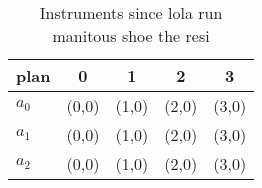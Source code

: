 \documentclass[a4paper]{article}
\begin{document}
\begin{table}
\begin{adjustbox}{width=0.5\columnwidth}
\begin{tabular}{|l|l|l|l|l|}
\hline
\textbf{plan} & \multicolumn{1}{c|}{\textbf{0}} & \multicolumn{1}{c|}{\textbf{1}} & \multicolumn{1}{c|}{\textbf{2}} & \multicolumn{1}{c|}{\textbf{3}} \\ \hline
\textbf{$a_0$}  & (0,0) & (1,0) & (2,0) & (3,0) \\ \hline
\textbf{$a_1$}  & (0,0) & (1,0) & (2,0) & (3,0) \\ \hline
\textbf{$a_2$}  & (0,0) & (1,0) & (2,0) & (3,0) \\ \hline
\end{tabular}
\end{adjustbox}
\caption{Instruments since lola run manitous shoe the resi
}
\end{table}
\end{document}
